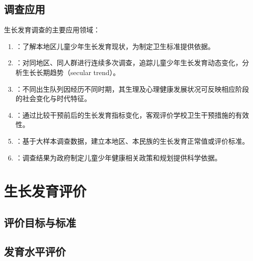 \subsection{调查应用}

\begin{defbox}
生长发育调查的主要应用领域：

\begin{enumerate}[leftmargin=*]
    \item {}：了解本地区儿童少年生长发育现状，为制定卫生标准提供依据。
    \item {}：对同地区、同人群进行连续多次调查，追踪儿童少年生长发育动态变化，分析生长长期趋势（secular trend）。
    \item {}：不同出生队列因经历不同时期，其生理及心理健康发展状况可反映相应阶段的社会变化与时代特征。
    \item {}：通过比较干预前后的生长发育指标变化，客观评价学校卫生干预措施的有效性。
    \item {}：基于大样本调查数据，建立本地区、本民族的生长发育正常值或评价标准。
    \item {}：调查结果为政府制定儿童少年健康相关政策和规划提供科学依据。
\end{enumerate}
\end{defbox}

\section{生长发育评价}

\subsection{评价目标与标准}

\subsection{发育水平评价}

